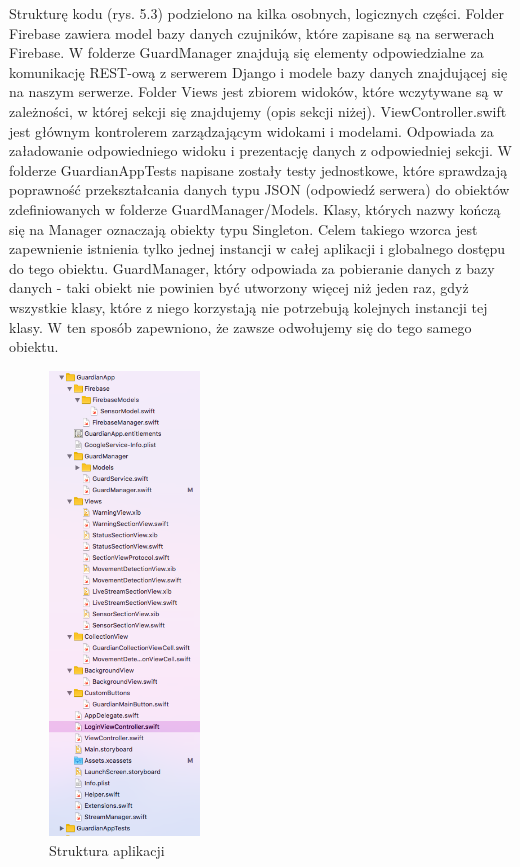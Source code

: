 Strukturę kodu (rys. 5.3) podzielono na kilka osobnych, logicznych części. Folder Firebase zawiera model bazy danych czujników, które zapisane są na serwerach Firebase. W folderze GuardManager znajdują się elementy odpowiedzialne za komunikację REST-ową z serwerem Django i modele bazy danych znajdującej się na naszym serwerze. Folder Views jest zbiorem widoków, które wczytywane są w zależności, w której sekcji się znajdujemy (opis sekcji niżej). ViewController.swift jest głównym kontrolerem zarządzającym widokami i modelami. Odpowiada za załadowanie odpowiedniego widoku i prezentację danych z odpowiedniej sekcji. W folderze GuardianAppTests napisane zostały testy jednostkowe, które sprawdzają poprawność przekształcania danych typu JSON (odpowiedź serwera) do obiektów zdefiniowanych w folderze GuardManager/Models. Klasy, których nazwy kończą się na Manager oznaczają obiekty typu Singleton. Celem takiego wzorca jest zapewnienie istnienia tylko jednej instancji w całej aplikacji i globalnego dostępu do tego obiektu. GuardManager, który odpowiada za pobieranie danych z bazy danych - taki obiekt nie powinien być utworzony więcej niż jeden raz, gdyż wszystkie klasy, które z niego korzystają nie potrzebują kolejnych instancji tej klasy. W ten sposób zapewniono, że zawsze odwołujemy się do tego samego obiektu.
\begin{figure}[ht]
	\centering
	\includegraphics[width=4cm]{ios_screenshots/iOSstructure.png}
	\caption{Struktura aplikacji}
\end{figure}
